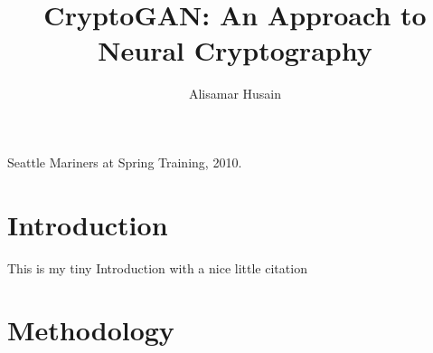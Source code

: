 \documentclass[sigconf]{acmart}
\begin{document}
  \title{CryptoGAN: An Approach to Neural Cryptography}

  \author{Alisamar Husain}
  \authornotemark[1]

  \begin{abstract}
    \lipsum[1]
  \end{abstract}
  
  \begin{teaserfigure}
    \caption{Seattle Mariners at Spring Training, 2010.}
    \label{fig:teaser}
  \end{teaserfigure}

  \maketitle
 
  \section{Introduction}
  This is my tiny Introduction with a nice 
  little citation \cite{visualloss}

  \section{Methodology} 
  \lipsum
  
  
  
\end{document}
